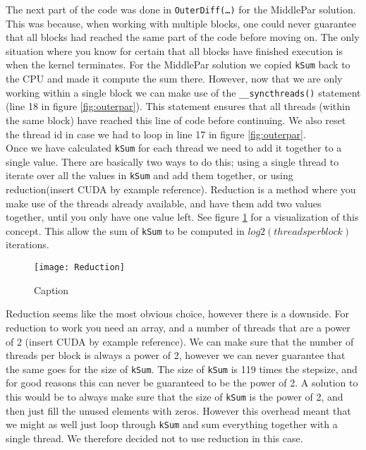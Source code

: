 The next part of the code was done in \texttt{OuterDiff(…)} for the MiddlePar solution. This was because, when working with multiple blocks, one could never guarantee that all blocks had reached the same part of the code before moving on. The only situation where you know for certain that all blocks have finished execution is when the kernel terminates. For the MiddlePar solution we copied \texttt{kSum} back to the CPU and made it compute the sum there. However, now that we are only working within a single block we can make use of the \texttt{\_\_syncthreads()} statement (line 18 in figure \ref{fig:outerpar}). This statement ensures that all threads (within the same block) have reached this line of code before continuing. We also reset the thread id in case we had to loop in line 17 in figure \ref{fig:outerpar}. \\

Once we have calculated \texttt{kSum} for each thread we need to add it together to a single value. There are basically two ways to do this; using a single thread to iterate over all the values in \texttt{kSum} and add them together, or using reduction(insert CUDA by example reference). Reduction is a method where you make use of the threads already available, and have them add two values together, until you only have one value left. See figure \ref{fig:reduction} for a visualization of this concept. This allow the sum of \texttt{kSum} to be computed in $log2(threadsperblock)$ iterations.\\

\begin{figure}[ht!]
  \centering
    \texttt{[image: Reduction]}
  \caption{Caption}
  \label{fig:reduction}
\end{figure}

Reduction seems like the most obvious choice, however there is a downside. For reduction to work you need an array, and a number of threads that are a power of 2 (insert CUDA by example reference). We can make sure that the number of threads per block is always a power of 2, however we can never guarantee that the same goes for the size of \texttt{kSum}. The size of \texttt{kSum} is 119 times the stepsize, and for good reasons this can never be guaranteed to be the power of 2. A solution to this would be to always make sure that the size of \texttt{kSum} is the power of 2, and then just fill the unused elements with zeros. However this overhead meant that we might as well just loop through \texttt{kSum} and sum everything together with a single thread. We therefore decided not to use reduction in this case.\\

